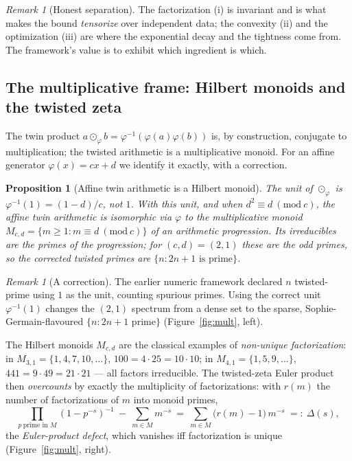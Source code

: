 \documentclass[11pt,a4paper]{article}
\theoremstyle{plain}
\newtheorem{proposition}[theorem]{Proposition}
\theoremstyle{definition}
\theoremstyle{remark}
\newtheorem{remark}[theorem]{Remark}
\begin{document}
\begin{remark}[Honest separation]
The factorization (i) is invariant and is what makes the bound \emph{tensorize}
over independent data; the convexity (ii) and the optimization (iii) are where
the exponential decay and the tightness come from. The framework's value is to
exhibit which ingredient is which.
\end{remark}

\subsection{The multiplicative frame: Hilbert monoids and the twisted zeta}

The twin product $a\odot_\varphi b=\varphi^{-1}(\varphi(a)\varphi(b))$ is, by
construction, conjugate to multiplication; the twisted arithmetic is a
multiplicative monoid. For an affine generator $\varphi(x)=cx+d$ we identify it
exactly, with a correction.

\begin{proposition}[Affine twin arithmetic is a Hilbert monoid]\label{prop:hilbert}
The unit of $\odot_\varphi$ is $\varphi^{-1}(1)=(1-d)/c$, \emph{not} $1$. With
this unit, and when $d^2\equiv d\ (\mathrm{mod}\ c)$, the affine twin arithmetic
is isomorphic via $\varphi$ to the multiplicative monoid
$M_{c,d}=\{m\ge1:m\equiv d\ (\mathrm{mod}\ c)\}$ of an arithmetic progression.
Its irreducibles are the primes of the progression; for $(c,d)=(2,1)$ these are
the odd primes, so the corrected twisted primes are $\{n:2n+1\text{ is prime}\}$.
\end{proposition}

\begin{remark}[A correction]
The earlier numeric framework declared $n$ twisted-prime using $1$ as the unit,
counting spurious primes. Using the correct unit $\varphi^{-1}(1)$ changes the
$(2,1)$ spectrum from a dense set to the sparse, Sophie-Germain-flavoured
$\{n:2n+1\text{ prime}\}$ (Figure~\ref{fig:mult}, left).
\end{remark}

The Hilbert monoids $M_{c,d}$ are the classical examples of \emph{non-unique
factorization}: in $M_{3,1}=\{1,4,7,10,\dots\}$, $100=4\cdot25=10\cdot10$; in
$M_{4,1}=\{1,5,9,\dots\}$, $441=9\cdot49=21\cdot21$ --- all factors irreducible.
The twisted-zeta Euler product then \emph{overcounts} by exactly the
multiplicity of factorizations: with $r(m)$ the number of factorizations of $m$
into monoid primes,
\begin{equation}\label{eq:eulerdefect}
\prod_{p\ \text{prime in }M}\!\!(1-p^{-s})^{-1}
\ -\ \sum_{m\in M} m^{-s}
\ =\ \sum_{m\in M}\bigl(r(m)-1\bigr)\,m^{-s}\ =:\ \Delta(s),
\end{equation}
the \emph{Euler-product defect}, which vanishes iff factorization is unique
(Figure~\ref{fig:mult}, right).
\end{document}
